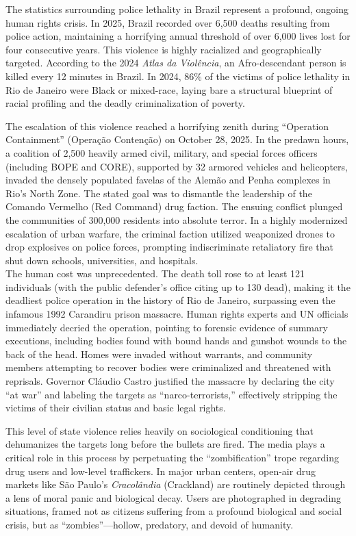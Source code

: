 The statistics surrounding police lethality in Brazil represent a profound, ongoing human rights crisis. In 2025, Brazil recorded over 6,500 deaths resulting from police action, maintaining a horrifying annual threshold of over 6,000 lives lost for four consecutive years. This violence is highly racialized and geographically targeted. According to the 2024 \emph{Atlas da Violência}, an Afro-descendant person is killed every 12 minutes in Brazil. In 2024, 86\% of the victims of police lethality in Rio de Janeiro were Black or mixed-race, laying bare a structural blueprint of racial profiling and the deadly criminalization of poverty.

The escalation of this violence reached a horrifying zenith during ``Operation Containment'' (Operação Contenção) on October 28, 2025. In the predawn hours, a coalition of 2,500 heavily armed civil, military, and special forces officers (including BOPE and CORE), supported by 32 armored vehicles and helicopters, invaded the densely populated favelas of the Alemão and Penha complexes in Rio's North Zone. The stated goal was to dismantle the leadership of the Comando Vermelho (Red Command) drug faction. The ensuing conflict plunged the communities of 300,000 residents into absolute terror. In a highly modernized escalation of urban warfare, the criminal faction utilized weaponized drones to drop explosives on police forces, prompting indiscriminate retaliatory fire that shut down schools, universities, and hospitals.\\
The human cost was unprecedented. The death toll rose to at least 121 individuals (with the public defender's office citing up to 130 dead), making it the deadliest police operation in the history of Rio de Janeiro, surpassing even the infamous 1992 Carandiru prison massacre. Human rights experts and UN officials immediately decried the operation, pointing to forensic evidence of summary executions, including bodies found with bound hands and gunshot wounds to the back of the head. Homes were invaded without warrants, and community members attempting to recover bodies were criminalized and threatened with reprisals. Governor Cláudio Castro justified the massacre by declaring the city ``at war'' and labeling the targets as ``narco-terrorists,'' effectively stripping the victims of their civilian status and basic legal rights.

This level of state violence relies heavily on sociological conditioning that dehumanizes the targets long before the bullets are fired. The media plays a critical role in this process by perpetuating the ``zombification'' trope regarding drug users and low-level traffickers. In major urban centers, open-air drug markets like São Paulo's \emph{Cracolândia} (Crackland) are routinely depicted through a lens of moral panic and biological decay. Users are photographed in degrading situations, framed not as citizens suffering from a profound biological and social crisis, but as ``zombies''---hollow, predatory, and devoid of humanity.

